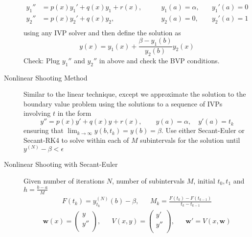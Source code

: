 \documentclass[8pt]{article}
\begin{document}
\begin{multicols}{2}
\begin{description}
\begin{equation*}
      \begin{aligned}
        y_1'' &= p(x)y_1' + q(x)y_1 + r(x), &\qquad y_1(a)=\alpha,&\quad y_1'(a)=0 \\
        y_2'' &= p(x)y_2' + q(x)y_2, &\qquad y_2(a)=0,&\quad y_2'(a) = 1\\
      \end{aligned}
    \end{equation*}
    using any IVP solver and then define the solution as 
    $$ y(x) = y_1(x)+\frac{\beta - y_1(b)}{y_2(b)}y_2(x) $$
    Check: Plug $y_1''$ and $y_2''$ in above and check the BVP
    conditions.
  \item[Nonlinear Shooting Method] Similar to the linear technique,
    except we approximate the solution to the boundary value problem
    using the solutions to a sequence of IVPs involving $t$ in the
    form
    $$ y'' = p(x)y' + q(x)y + r(x), \qquad y(a)=\alpha,\quad y'(a)=t_k $$
    ensuring that $\lim_{k\rightarrow\infty}y(b,t_k)=y(b)=\beta$.
    Use either Secant-Euler or Secant-RK4 to solve within each of $M$
    subintervals for the solution until $y^{(N)}-\beta < \epsilon$
  \item[Nonlinear Shooting with Secant-Euler] Given number of iterations $N$,
    number of subintervals $M$, initial $t_0, t_1$ and $h=\frac{b-a}{M}$
    \begin{equation*}
      \begin{aligned}
        F(t_k) = y^{(N)}_{t_k}(b) - \beta, &&
        M_k = \frac{F(t_{k})-F(t_{k-1})}{t_{k}-t_{k-1}}
      \end{aligned}
    \end{equation*}
    \begin{equation*}
      \begin{aligned}
         \mathbf{w}(x) = \begin{pmatrix}
          y \\
          y'' \\
        \end{pmatrix}, && V(x,y) =
        \begin{pmatrix}
          y' \\
          y'' \\
        \end{pmatrix}, && \mathbf{w}' = V(x,\mathbf{w})
      \end{aligned}
    \end{equation*}

\end{description}
\end{multicols}
\end{document}
